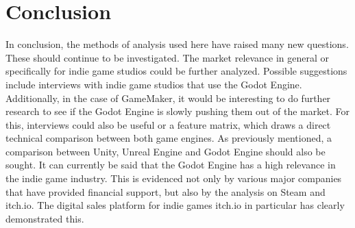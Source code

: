 \section{Conclusion}
In conclusion, the methods of analysis used here have raised many new questions.
These should continue to be investigated.
The market relevance in general or specifically for indie game studios could be further analyzed.
Possible suggestions include interviews with indie game studios that use the Godot Engine.
Additionally, in the case of GameMaker, it would be interesting to do further research to see if the Godot Engine is slowly pushing them out of the market.
For this, interviews could also be useful or a feature matrix, which draws a direct technical comparison between both game engines.
As previously mentioned, a comparison between Unity, Unreal Engine and Godot Engine should also be sought.
It can currently be said that the Godot Engine has a high relevance in the indie game industry.
This is evidenced not only by various major companies that have provided financial support, but also by the analysis on Steam and itch.io. 
The digital sales platform for indie games itch.io in particular has clearly demonstrated this.
